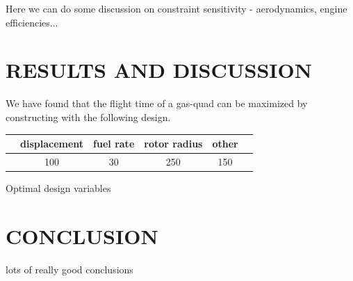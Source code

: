 \documentclass[letterpaper, 10 pt, conference]{ieeeconf}  %
\makeatletter
\newenvironment{tablehere}
  {\def\@captype{table}}
  {}
\makeatother
\begin{document}
Here we can do some discussion on constraint sensitivity - aerodynamics, engine efficiencies...

\section{RESULTS AND DISCUSSION}

We have found that the flight time of a gas-quad can be maximized by constructing with the following design.

\begin{tablehere}
\centering
\begin{tabulary}{0.5\textwidth}{|C|C|C|C|C|C|}
\hline
       & displacement & fuel rate & rotor radius & other \\ \hline
  & 100 & 30 & 250 & 150 \\ \hline
\end{tabulary}
\caption{Optimal design variables}
\label{table:fw_loop_rates}
\end{tablehere}



\section{CONCLUSION}

lots of really good conclusions









\end{document}
